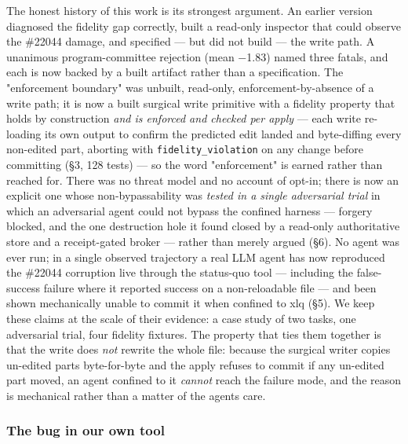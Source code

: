 \documentclass[
]{article}
\begin{document}
The honest history of this work is its strongest argument. An earlier
version diagnosed the fidelity gap correctly, built a read-only
inspector that could observe the \#22044 damage, and specified --- but
did not build --- the write path. A unanimous program-committee
rejection (mean −1.83) named three fatals, and each is now backed by a
built artifact rather than a specification. The "enforcement boundary"
was unbuilt, read-only, enforcement-by-absence of a write path; it is
now a built surgical write primitive with a fidelity property that holds
by construction \emph{and is enforced and checked per apply} --- each
write re-loading its own output to confirm the predicted edit landed and
byte-diffing every non-edited part, aborting with
\texttt{fidelity\_violation} on any change before committing (§3, 128
tests) --- so the word "enforcement" is earned rather than reached for.
There was no threat model and no account of opt-in; there is now an
explicit one whose non-bypassability was \emph{tested in a single
adversarial trial} in which an adversarial agent could not bypass the
confined harness --- forgery blocked, and the one destruction hole it
found closed by a read-only authoritative store and a receipt-gated
broker --- rather than merely argued (§6). No agent was ever run; in a
single observed trajectory a real LLM agent has now reproduced the
\#22044 corruption live through the status-quo tool --- including the
false-success failure where it reported success on a non-reloadable file
--- and been shown mechanically unable to commit it when confined to xlq
(§5). We keep these claims at the scale of their evidence: a case study
of two tasks, one adversarial trial, four fidelity fixtures. The
property that ties them together is that the write does \emph{not}
rewrite the whole file: because the surgical writer copies un-edited
parts byte-for-byte and the apply refuses to commit if any un-edited
part moved, an agent confined to it \emph{cannot} reach the failure
mode, and the reason is mechanical rather than a matter of the
agent\textquotesingle s care.

\subsubsection{The bug in our own tool}\label{the-bug-in-our-own-tool}
\end{document}
